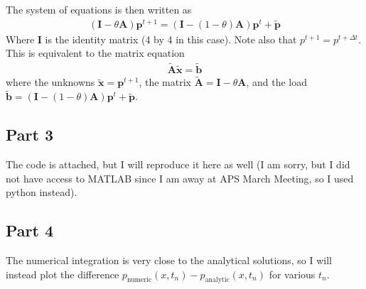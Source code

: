 \documentclass{article}
\begin{document}
The system of equations is then written as
\begin{align}
    (\mathbf{I} - \theta \mathbf{A}) \mathbf{p}^{t+1} = (\mathbf{I} - (1 - \theta) \mathbf{A}) \mathbf{p}^t + \tilde{\mathbf{p}}
\end{align}
Where $\mathbf{I}$ is the identity matrix (4 by 4 in this case).
Note also that $p^{t+1} = p^{t+\Delta t}$. This is equivalent to the matrix equation
\begin{align}
    \tilde{\mathbf{A}} \tilde{\mathbf{x}} = \tilde{\mathbf{b}}
\end{align}
where the unknowns $\tilde{\mathbf{x}} = \mathbf{p}^{t+1}$, the matrix $\tilde{\mathbf{A}} = \mathbf{I} - \theta \mathbf{A}$, and the load $\tilde{\mathbf{b}} = (\mathbf{I} - (1 - \theta) \mathbf{A}) \mathbf{p}^t + \tilde{\mathbf{p}}$.


\subsection{Part 3}
The code is attached, but I will reproduce it here as well (I am sorry, but I did not have access to MATLAB since I am away at APS March Meeting, so I used python instead).


\subsection{Part 4}
The numerical integration is very close to the analytical solutions, so I will instead plot the difference $p_{\mathrm{numeric}}(x,t_n) - p_{\mathrm{analytic}}(x,t_n)$ for various $t_n$.
\end{document}
